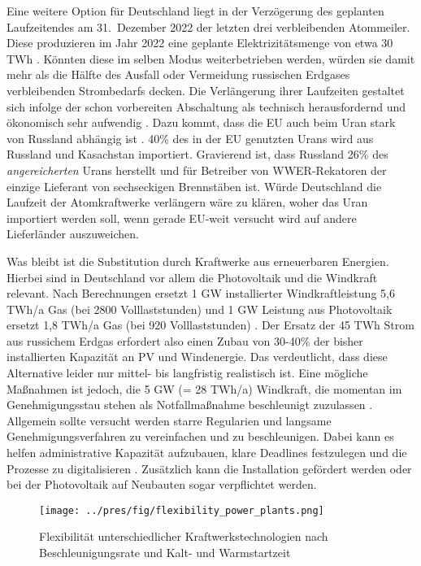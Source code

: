 Eine weitere Option für Deutschland liegt in der Verzögerung des geplanten Laufzeitendes am 31.~Dezember 2022 der letzten drei verbleibenden Atommeiler. Diese produzieren im Jahr 2022 eine geplante Elektrizitätsmenge von etwa 30 TWh \cite{kernkraftwerke-rest}. Könnten diese im selben Modus weiterbetrieben werden, würden sie damit mehr als die Hälfte des Ausfall oder Vermeidung russischen Erdgases verbleibenden Strombedarfs decken. Die Verlängerung ihrer Laufzeiten gestaltet sich infolge der schon vorbereiten Abschaltung als technisch herausfordernd und ökonomisch sehr aufwendig \cite{leo}. Dazu kommt, dass die EU auch beim Uran stark von Russland abhängig ist \cite{spigel-uran}. 40\% des in der EU genutzten Urans wird aus Russland und Kasachstan importiert. Gravierend ist, dass Russland 26\% des \textit{angereicherten} Urans herstellt und für Betreiber von WWER-Rekatoren der einzige Lieferant von sechseckigen Brennstäben ist.
Würde Deutschland die Laufzeit der Atomkraftwerke verlängern wäre zu klären, woher das Uran importiert werden soll, wenn gerade EU-weit versucht wird auf andere Lieferländer auszuweichen.

Was bleibt ist die Substitution durch Kraftwerke aus erneuerbaren Energien. Hierbei sind in Deutschland vor allem die Photovoltaik und die Windkraft relevant. Nach Berechnungen ersetzt 1 GW installierter Windkraftleistung 5,6 TWh/a Gas (bei 2800 Volllaststunden) und 1 GW Leistung aus Photovoltaik ersetzt 1,8 TWh/a Gas (bei 920 Volllaststunden) \cite{clausen2022}. Der Ersatz der 45 TWh Strom aus russichem Erdgas erfordert also einen Zubau von 30-40\% der bisher installierten Kapazität an PV und Windenergie. Das verdeutlicht, dass diese Alternative leider nur mittel- bis langfristig realistisch ist. Eine mögliche Maßnahmen ist jedoch, die 5 GW (= 28 TWh/a) Windkraft, die momentan im Genehmigungsstau stehen als Notfallmaßnahme beschleunigt zuzulassen \cite{clausen2022}. Allgemein sollte versucht werden starre Regularien und langsame Genehmigungsverfahren zu vereinfachen und zu beschleunigen. Dabei kann es helfen administrative Kapazität aufzubauen, klare Deadlines festzulegen und die Prozesse zu digitalisieren \cite{iea2022}. Zusätzlich kann die Installation gefördert werden oder bei der Photovoltaik auf Neubauten sogar verpflichtet werden.

\begin{figure}
\centering
\texttt{[image: ../pres/fig/flexibility\_power\_plants.png]}
\caption{Flexibilität unterschiedlicher Kraftwerkstechnologien nach Beschleunigungsrate und Kalt- und Warmstartzeit \cite{agora}}
\label{fig:flexibility}
\end{figure}

